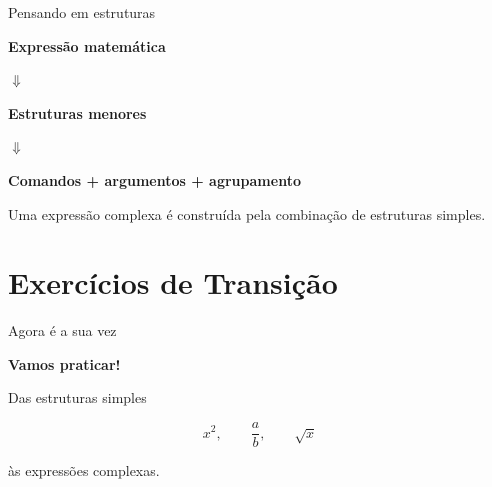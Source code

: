 \documentclass[aspectratio=169,xcolor=dvipsnames]{beamer}
\begin{document}
\begin{frame}{Pensando em estruturas}

    \begin{center}

        \Large
        \textbf{Expressão matemática}

        \vspace{0.5cm}

        $\Downarrow$

        \vspace{0.5cm}

        \textbf{Estruturas menores}

        \vspace{0.5cm}

        $\Downarrow$

        \vspace{0.5cm}

        \textbf{Comandos + argumentos + agrupamento}

    \end{center}

    \vspace{0.5cm}

    \begin{center}
        Uma expressão complexa é construída pela combinação
        de estruturas simples.
    \end{center}

\end{frame}


\section{Exercícios de Transição}

\begin{frame}{Agora é a sua vez}

    \begin{center}

        \Huge
        \textbf{Vamos praticar!}

        \vspace{1cm}

        \Large

        Das estruturas simples

        \[
            x^2,\qquad
            \frac{a}{b},\qquad
            \sqrt{x}
        \]

        às expressões complexas.

    \end{center}

\end{frame}
\end{document}
